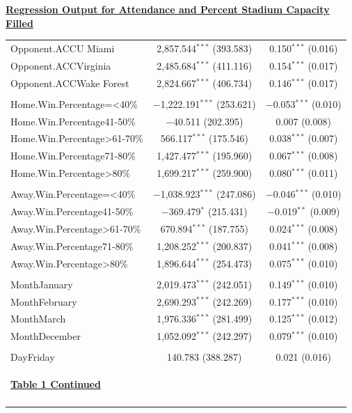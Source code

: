 \documentclass[preprint,12pt,times]{elsarticle}
\begin{document}
\begin{center}{\textbf{\ul{Regression Output for Attendance and Percent Stadium Capacity Filled}}}
\begin{longtable}{@{\extracolsep{5pt}}lcc}
 Opponent.ACCU Miami & 2,857.544$^{***}$ (393.583) & 0.150$^{***}$ (0.016)\\ 
 Opponent.ACCVirginia & 2,485.684$^{***}$ (411.116) & 0.154$^{***}$ (0.017)\\ 
 Opponent.ACCWake Forest & 2,824.667$^{***}$ (406.734) & 0.146$^{***}$ (0.017)\\ 
 \\
 Home.Win.Percentage=\textless 40\% & $-$1,222.191$^{***}$ (253.621) & $-$0.053$^{***}$ (0.010)\\ 
 Home.Win.Percentage41-50\% & $-$40.511 (202.395) & 0.007 (0.008)\\
 Home.Win.Percentage\textgreater 61-70\% & 566.117$^{***}$ (175.546) & 0.038$^{***}$ (0.007)\\ 
 Home.Win.Percentage71-80\% & 1,427.477$^{***}$ (195.960) & 0.067$^{***}$ (0.008)\\ 
 Home.Win.Percentage\textgreater 80\% & 1,699.217$^{***}$ (259.900) & 0.080$^{***}$ (0.011)\\
 \\
 Away.Win.Percentage=\textless 40\% & $-$1,038.923$^{***}$ (247.086) & $-$0.046$^{***}$ (0.010)\\
 Away.Win.Percentage41-50\% & $-$369.479$^{*}$ (215.431) & $-$0.019$^{**}$ (0.009)\\ 
 Away.Win.Percentage\textgreater 61-70\% & 670.894$^{***}$ (187.755) & 0.024$^{***}$ (0.008)\\ 
 Away.Win.Percentage71-80\% & 1,208.252$^{***}$ (200.837) & 0.041$^{***}$ (0.008)\\ 
 Away.Win.Percentage\textgreater 80\% & 1,896.644$^{***}$ (254.473) & 0.075$^{***}$ (0.010)\\ 
 \\           
 MonthJanuary & 2,019.473$^{***}$ (242.051) & 0.149$^{***}$ (0.010)\\ 
 MonthFebruary & 2,690.293$^{***}$ (242.269) & 0.177$^{***}$ (0.010)\\ 
 MonthMarch & 1,976.336$^{***}$ (281.499) & 0.125$^{***}$ (0.012)\\ 
 MonthDecember & 1,052.092$^{***}$ (242.297) & 0.079$^{***}$ (0.010)\\
 \\
 DayFriday & 140.783 (388.287) & 0.021 (0.016)\\
 \begin{large}
\ul{\textbf{Table 1 Continued}}
\end{large}\\
\hline \\[-1.8ex]

\end{longtable}
\end{center}
\end{document}

